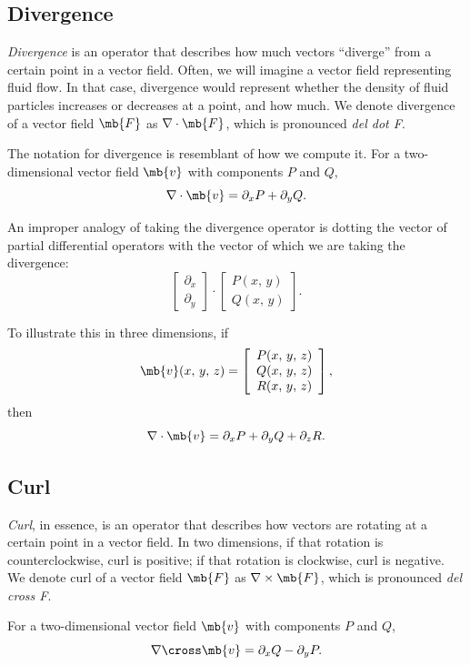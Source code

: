 \documentclass[11pt]{article}
\theoremstyle{definition}
\begin{document}
\subsection{Divergence}
\textit{Divergence} is an operator that describes how much vectors ``diverge'' from a certain point in a vector field. Often, we will imagine a vector field representing fluid flow. In that case, divergence would represent whether the density of fluid particles increases or decreases at a point, and how much. We denote divergence of a vector field $\mb{F}$ as $\nabla \cdot \mb{F}$, which is pronounced \textit{del dot F}.


The notation for divergence is resemblant of how we compute it. For a two-dimensional vector field $\mb{v}$ with components $P$ and $Q$, 
$$
\nabla\cdot\mb{v} = \partial_x P + \partial_y Q.
$$


An improper analogy of taking the divergence operator is dotting the vector of partial differential operators with the vector of which we are taking the divergence:
$$
 \left[\begin{array}{c}\partial_x\\\partial_y\end{array}\right] \cdot  \left[\begin{array}{c}P(x,\, y)\\Q(x,\, y)\end{array}\right] .
$$


To illustrate this in three dimensions, if
$$
\mb{v}(x,\, y,\, z) = \left[\begin{array}{c}P(x,\, y,\, z)\\Q(x,\, y,\, z)\\ R(x,\,y,\,z)\end{array}\right] ,
$$
then
$$
\nabla \cdot \mb{v} =  \partial_x P +  \partial_y Q +  \partial_z R.
$$




\subsection{Curl}
 \textit{Curl}, in essence, is an operator that describes how vectors are rotating at a certain point in a vector field. In two dimensions, if that rotation is counterclockwise, curl is positive; if that rotation is clockwise, curl is negative. We denote curl of a vector field $\mb{F}$ as $\nabla \times \mb{F}$, which is pronounced \textit{del cross F}. 
 
 
For a two-dimensional vector field $\mb{v}$ with components $P$ and $Q$, 
$$
\nabla\cross\mb{v} = \partial_x Q - \partial_y P.
$$
\end{document}
